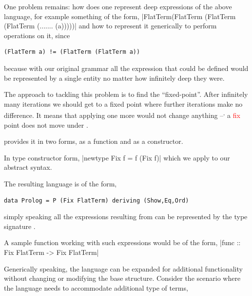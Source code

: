 \documentclass[thesis-solanki.tex]{subfiles}
\begin{document}
One problem remains: how does one represent deep expressions
of the above language, 
for example something of the form,
|FlatTerm(FlatTerm (FlatTerm (FlatTerm (....... (a)))))|
and how to represent it generically to perform operations on it, since
\begin{verbatim}
(FlatTerm a) != (FlatTerm (FlatTerm a))
\end{verbatim}
%
because with our original grammar all the expression that could be defined would be represented by a single entity
 no matter how infinitely deep they were.

The approach to tackling this problem is to find the ``fixed-point''.
After infinitely many iterations we should get to a fixed point where further iterations make no
difference.
It means that applying one more  would not change anything --\textsuperscript{,}
a \textcolor{red}{fix}
point does not move under .

 provides it in two forms, as a function and as a constructor.

In type constructor form,
|newtype Fix f = f (Fix f)|
which we apply to our abstract syntax.


The resulting language is of the form,
\begin{verbatim}
data Prolog = P (Fix FlatTerm) deriving (Show,Eq,Ord)
\end{verbatim}
%
simply speaking all the expressions resulting from  can be represented  by the type signature .

A sample function working with such expressions would be of the form,
|func :: Fix FlatTerm -> Fix FlatTerm|


Generically speaking, the language can be expanded for additional functionality without changing or modifying the base structure. Consider
the scenario where the language needs to accommodate additional type of terms,
\end{document}
